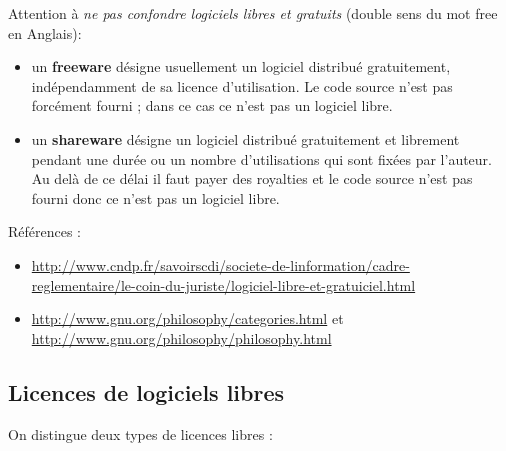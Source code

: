 \documentclass[
  11pt,
]{article}
\newcounter{logi}
\begin{document}
Attention à \emph{ne pas confondre logiciels libres et gratuits} (double
sens du mot free en Anglais):

\begin{itemize}
\item
  un \textbf{freeware} désigne usuellement un logiciel distribué
  gratuitement, indépendamment de sa licence d'utilisation. Le code
  source n'est pas forcément fourni ; dans ce cas ce n'est pas un
  logiciel libre.
\item
  un \textbf{shareware} désigne un logiciel distribué gratuitement et
  librement pendant une durée ou un nombre d'utilisations qui sont
  fixées par l'auteur. Au delà de ce délai il faut payer des royalties
  et le code source n'est pas fourni donc ce n'est pas un logiciel
  libre.
\end{itemize}

Références :

\begin{itemize}
\item
  \url{http://www.cndp.fr/savoirscdi/societe-de-linformation/cadre-reglementaire/le-coin-du-juriste/logiciel-libre-et-gratuiciel.html}
\item
  \url{http://www.gnu.org/philosophy/categories.html} et
  \url{http://www.gnu.org/philosophy/philosophy.html}
\end{itemize}

\hypertarget{licences-de-logiciels-libres}{%
\subsection{Licences de logiciels
libres}\label{licences-de-logiciels-libres}}

On distingue deux types de licences libres :
\end{document}
